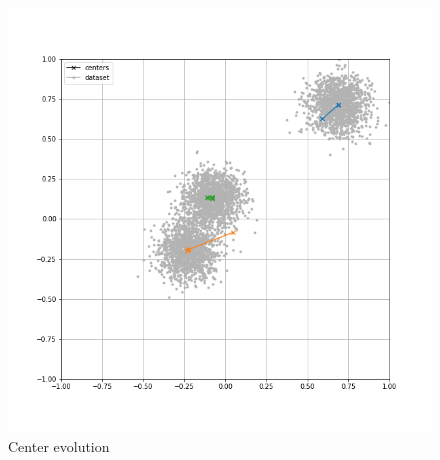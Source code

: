 \begin{figure}[!ht]
    \includegraphics[width=\linewidth]{images/summary_iteration.png}
    \caption{Center evolution}
    \label{fig:summary_iteration}
\end{figure}
